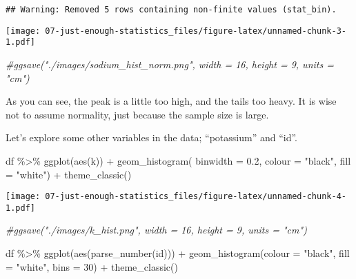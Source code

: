 \documentclass[
]{article}
\newenvironment{Shaded}{\begin{snugshade}}{\end{snugshade}}
\newcommand{\AttributeTok}[1]{\textcolor[rgb]{0.77,0.63,0.00}{#1}}
\newcommand{\CommentTok}[1]{\textcolor[rgb]{0.56,0.35,0.01}{\textit{#1}}}
\newcommand{\DecValTok}[1]{\textcolor[rgb]{0.00,0.00,0.81}{#1}}
\newcommand{\FloatTok}[1]{\textcolor[rgb]{0.00,0.00,0.81}{#1}}
\newcommand{\FunctionTok}[1]{\textcolor[rgb]{0.00,0.00,0.00}{#1}}
\newcommand{\NormalTok}[1]{#1}
\newcommand{\SpecialCharTok}[1]{\textcolor[rgb]{0.00,0.00,0.00}{#1}}
\newcommand{\StringTok}[1]{\textcolor[rgb]{0.31,0.60,0.02}{#1}}
\begin{document}
\begin{verbatim}
## Warning: Removed 5 rows containing non-finite values (stat_bin).
\end{verbatim}

\texttt{[image: 07-just-enough-statistics\_files/figure-latex/unnamed-chunk-3-1.pdf]}

\begin{Shaded}
\begin{Highlighting}[]
\CommentTok{\#ggsave("./images/sodium\_hist\_norm.png", width = 16, height = 9, units = "cm")}
\end{Highlighting}
\end{Shaded}

As you can see, the peak is a little too high, and the tails too heavy.
It is wise not to assume normality, just because the sample size is
large.

Let's explore some other variables in the data; ``potassium'' and
``id''.

\begin{Shaded}
\begin{Highlighting}[]
\NormalTok{df }\SpecialCharTok{\%\textgreater{}\%}
  \FunctionTok{ggplot}\NormalTok{(}\FunctionTok{aes}\NormalTok{(k)) }\SpecialCharTok{+}
  \FunctionTok{geom\_histogram}\NormalTok{(}
    \AttributeTok{binwidth =} \FloatTok{0.2}\NormalTok{,}
    \AttributeTok{colour =} \StringTok{"black"}\NormalTok{,}
    \AttributeTok{fill =} \StringTok{"white"}\NormalTok{) }\SpecialCharTok{+}
  \FunctionTok{theme\_classic}\NormalTok{()}
\end{Highlighting}
\end{Shaded}

\texttt{[image: 07-just-enough-statistics\_files/figure-latex/unnamed-chunk-4-1.pdf]}

\begin{Shaded}
\begin{Highlighting}[]
\CommentTok{\#ggsave("./images/k\_hist.png", width = 16, height = 9, units = "cm")}

\NormalTok{df }\SpecialCharTok{\%\textgreater{}\%}
  \FunctionTok{ggplot}\NormalTok{(}\FunctionTok{aes}\NormalTok{(}\FunctionTok{parse\_number}\NormalTok{(id))) }\SpecialCharTok{+} \FunctionTok{geom\_histogram}\NormalTok{(}\AttributeTok{colour =} \StringTok{"black"}\NormalTok{,}
    \AttributeTok{fill =} \StringTok{"white"}\NormalTok{, }\AttributeTok{bins =} \DecValTok{30}\NormalTok{) }\SpecialCharTok{+}
  \FunctionTok{theme\_classic}\NormalTok{()}
\end{Highlighting}
\end{Shaded}
\end{document}
